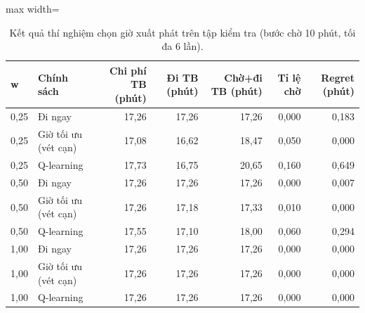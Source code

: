 \begin{table}[!htbp]
\centering
\small
\caption{Kết quả thí nghiệm chọn giờ xuất phát trên tập kiểm tra (bước chờ 10 phút, tối đa 6 lần).}
\label{tab:tab_departure}
\begin{adjustbox}{max width=\linewidth}
\begin{tabular}{llrrrrr}
\toprule
w & Chính sách & Chi phí TB (phút) & Đi TB (phút) & Chờ+đi TB (phút) & Tỉ lệ chờ & Regret (phút) \\
\midrule
0{,}25 & Đi ngay & 17{,}26 & 17{,}26 & 17{,}26 & 0{,}000 & 0{,}183 \\
0{,}25 & Giờ tối ưu (vét cạn) & 17{,}08 & 16{,}62 & 18{,}47 & 0{,}050 & 0{,}000 \\
0{,}25 & Q-learning & 17{,}73 & 16{,}75 & 20{,}65 & 0{,}160 & 0{,}649 \\
0{,}50 & Đi ngay & 17{,}26 & 17{,}26 & 17{,}26 & 0{,}000 & 0{,}007 \\
0{,}50 & Giờ tối ưu (vét cạn) & 17{,}26 & 17{,}18 & 17{,}33 & 0{,}010 & 0{,}000 \\
0{,}50 & Q-learning & 17{,}55 & 17{,}10 & 18{,}00 & 0{,}060 & 0{,}294 \\
1{,}00 & Đi ngay & 17{,}26 & 17{,}26 & 17{,}26 & 0{,}000 & 0{,}000 \\
1{,}00 & Giờ tối ưu (vét cạn) & 17{,}26 & 17{,}26 & 17{,}26 & 0{,}000 & 0{,}000 \\
1{,}00 & Q-learning & 17{,}26 & 17{,}26 & 17{,}26 & 0{,}000 & 0{,}000 \\
\bottomrule
\end{tabular}
\end{adjustbox}
\end{table}
